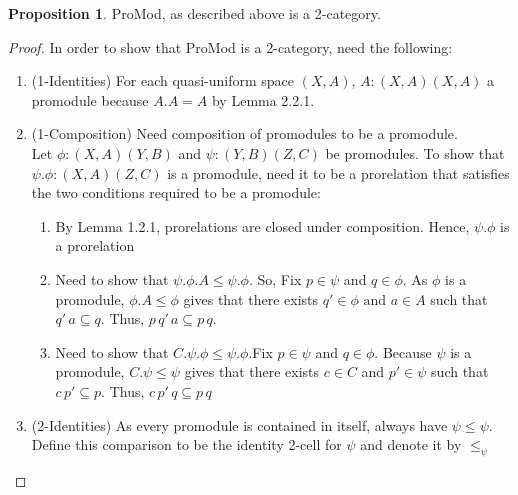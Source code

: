 \documentclass[18pt,a4paper]{article}
\makeatletter
\theoremstyle{definition}
\newtheorem{proop}[theorem]{Proposition}
\newcommand{\carrow}{}%
\DeclareRobustCommand{\carrow}{%
	\mathrel{\vphantom{\rightarrow}\mathpalette\circle@arrow\relax}%
}
\newcommand{\circle@arrow}[2]{%
	\m@th
	\ooalign{%
		\hidewidth$#1\circ\mkern1mu$\hidewidth\cr
	$#1\longrightarrow$\cr}%
}
\makeatother
\begin{document}
\begin{proop}%
	ProMod, as described above is a 2-category.
\end{proop}
\begin{proof}\setcounter{equation}{0}
	In order to show that ProMod is a 2-category, need the following:
	\begin{enumerate}[label=(\alph*)]
		\item (1-Identities) For each quasi-uniform space $(X,A)$,
			 $A:(X,A) \carrow (X,A)$ a promodule because $A.A=A$ by Lemma 2.2.1.
		\item (1-Composition) Need composition of promodules to be a promodule.\\
			Let $\phi:(X,A)\carrow (Y,B)$ and $\psi:(Y,B)\carrow (Z,C)$ be promodules.
			To show that $\psi.\phi:(X,A) \carrow (Z,C)$ is a promodule, need it to be a
			prorelation that satisfies the two conditions required to be a promodule:
			\begin{enumerate}[label=(\roman*)]
				\item By Lemma 1.2.1, prorelations are closed under composition.
					Hence, $\psi.\phi$ is a prorelation
				\item Need to show that $\psi.\phi.A \leq \psi.\phi$. So, Fix
					$p \in \psi$ and $q \in \phi$. As $\phi$ is a promodule,
					$\phi.A\leq \phi$ gives that there exists
					$ q' \in \phi \text{ and } a\in A$ such that
					$q'\,a \subseteq q$. Thus,
					$p\,q'\,a \subseteq p\,q$.
				\item Need to show that $C.\psi.\phi \leq \psi.\phi$.Fix $p \in \psi$
					and $q\in \phi$. Because
					$\psi$ is a promodule, $C.\psi \leq \psi$ gives that
					there exists $c\in C$ and $p' \in \psi$ such that
					$c\,p' \subseteq p$. Thus, $c\,p'\,q \subseteq p\,q$
			\end{enumerate}
		\item (2-Identities) As every promodule is contained in itself, always have $\psi \leq \psi$.
			Define this comparison to be the identity 2-cell for $\psi$ and denote it by $\leq_\psi$


\end{enumerate}
\end{proof}
\end{document}
